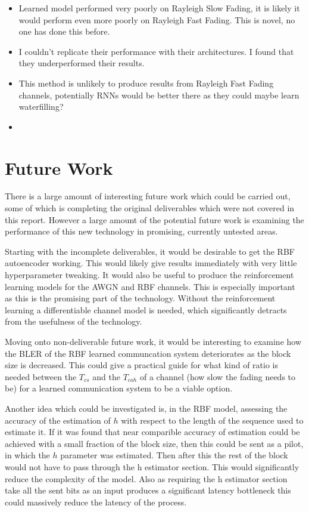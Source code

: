 \documentclass[12pt,onecolumn,letterpaper]{article}
\begin{document}
\begin{itemize}
   \item Learned model performed very poorly on Rayleigh Slow Fading, it is likely it would perform even more poorly on Rayleigh Fast Fading. This is novel, no one has done this before.
\end{itemize}


\begin{itemize}
   \item I couldn't replicate their performance with their architectures. I found that they underperformed their results.
   \item This method is unlikely to produce results from Rayleigh Fast Fading channels, potentially RNNs would be better there as they could maybe learn waterfilling?
   \item 
\end{itemize}


\FloatBarrier
\section{Future Work}

There is a large amount of interesting future work which could be carried out, some of which is completing the original deliverables which were not covered in this report. However a large amount of the potential future work is examining the performance of this new technology in promising, currently untested areas.

Starting with the incomplete deliverables, it would be desirable to get the RBF autoencoder working. This would likely give results immediately with very little hyperparameter tweaking. It would also be useful to produce the reinforcement learning models for the AWGN and RBF channels. This is especially important as this is the promising part of the technology. Without the reinforcement learning a differentiable channel model is needed, which significantly detracts from the usefulness of the technology. 

Moving onto non-deliverable future work, it would be interesting to examine how the BLER of the RBF learned communcation system deteriorates as the block size is decreased. This could give a practical guide for what kind of ratio is needed between the $T_{cs}$ and the $T_{coh}$ of a channel (how slow the fading needs to be) for a learned communication system to be a viable option.

Another idea which could be investigated is, in the RBF model, assessing the accuracy of the estimation of $h$ with respect to the length of the sequence used to estimate it. If it was found that near comparible accuracy of estimation could be achieved with a small fraction of the block size, then this could be sent as a pilot, in which the $h$ parameter was estimated. Then after this the rest of the block would not have to pass through the h estimator section. This would significantly reduce the complexity of the model. Also as requiring the h estimator section take all the sent bits as an input produces a significant latency bottleneck this could massively reduce the latency of the process.
\end{document}
